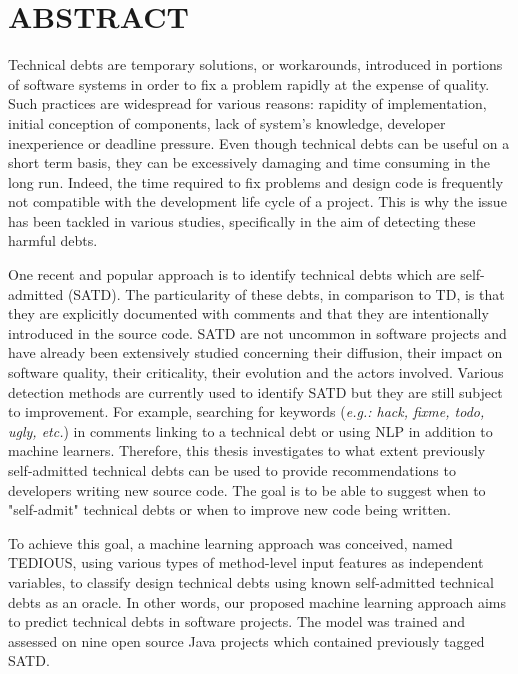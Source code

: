 %

\chapter*{ABSTRACT}\thispagestyle{headings}

\setlength{\parindent}{5ex} Technical debts are temporary solutions, or workarounds, introduced in portions of software systems in order to fix a problem rapidly at the expense of quality. Such practices are widespread for various reasons: rapidity of implementation, initial conception of components, lack of system's knowledge, developer inexperience or deadline pressure. Even though technical debts can be useful on a short term basis, they can be excessively damaging and time consuming in the long run. Indeed, the time required to fix problems and design code is frequently not compatible with the development life cycle of a project. This is why the issue has been tackled in various studies, specifically in the aim of detecting these harmful debts. \par

One recent and popular approach is to identify technical debts which are self-admitted (SATD). The particularity of these debts, in comparison to \ac{TD}, is that they are explicitly documented with comments and that they are intentionally introduced in the source code. \ac{SATD} are not uncommon in software projects and have already been extensively studied concerning their diffusion, their impact on software quality, their criticality, their evolution and the actors involved. Various detection methods are currently used to identify \ac{SATD} but they are still subject to improvement. For example, searching for keywords (\emph{e.g.: hack, fixme, todo, ugly, etc.}) in comments linking to a technical debt or using \ac{NLP} in addition to machine learners. Therefore, this thesis investigates to what extent previously self-admitted technical debts can be used to provide recommendations to developers writing new source code. The goal is to be able to suggest when to "self-admit" technical debts or when to improve new code being written. \par

To achieve this goal, a machine learning approach was conceived, named \ac{TEDIOUS}, using various types of method-level input features as independent variables, to classify design technical debts using known self-admitted technical debts as an oracle. In other words, our proposed machine learning approach aims to predict technical debts in software projects. The model was trained and assessed on nine open source Java projects which contained previously tagged \ac{SATD}. \par


